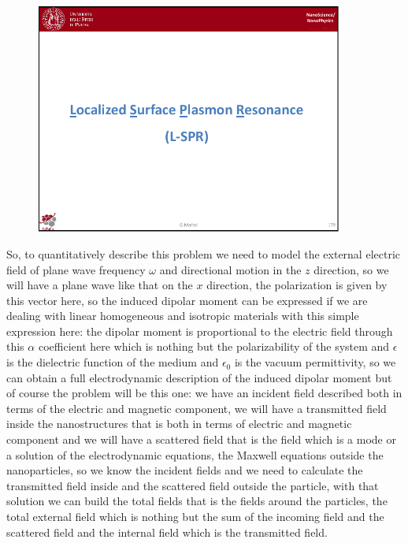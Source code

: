\documentclass[../main/main.tex]{subfiles}
\begin{document}
\begin{figure}[h!]
\centering
\includegraphics[page=9,width=0.9\textwidth]{../lessons/pdf_file/11_lesson.pdf}
\end{figure}

So, to quantitatively describe this problem we need to model the external electric field of plane wave frequency $\omega$ and directional motion in the $z$ direction, so we will have a plane wave like that on the $x$ direction, the polarization is given by this vector here, so the induced dipolar moment can be expressed if we are dealing with linear homogeneous and isotropic materials with this simple expression here: the dipolar moment is proportional to the electric field through this $\alpha$ coefficient here which is nothing but the polarizability of the system and $\epsilon$ is the dielectric function of the medium and $\epsilon_0$ is the vacuum permittivity, so we can obtain a full electrodynamic description of the induced dipolar moment but of course the problem will be this one: we have an incident field described both in terms of the electric and magnetic component, we will have a transmitted field inside the nanostructures that is both in terms of electric and magnetic component and we will have a scattered field that is the field which is a mode or a  solution of the electrodynamic equations, the Maxwell equations outside the nanoparticles, so we know the incident fields and we need to calculate the transmitted field inside and the scattered field outside the particle, with that solution we can build the total fields that is the fields around the particles, the total external field which is nothing but the sum of the incoming field and the scattered field and the internal field which is the transmitted field. 
\end{document}

